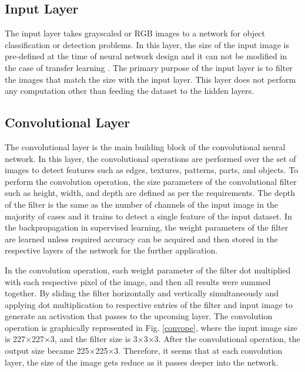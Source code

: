 \subsection{Input Layer}
The input layer takes grayscaled or RGB images to a network for object classification or detection problems. In this layer, the size of the input image is pre-defined at the time of neural network design and it can not be modified in the case of transfer learning \cite{coursera1}. The primary purpose of the input layer is to filter the images that match the size with the input layer. This layer does not perform any computation other than feeding the dataset to the hidden layers.

\subsection{Convolutional Layer}
The convolutional layer is the main building block of the convolutional neural network. In this layer, the convolutional operations are performed over the set of images to detect features such as edges, textures, patterns, parts, and objects. To perform the convolution operation, the size parameters of the convolutional filter such as height, width, and depth are defined as per the requirements. The depth of the filter is the same as the number of channels of the input image in the majority of cases and it trains to detect a single feature of the input dataset. In the backpropagation in supervised learning, the weight parameters of the filter are learned unless required accuracy can be acquired and then stored in the respective layers of the network for the further application. 

In the convolution operation, each weight parameter of the filter dot multiplied with each respective pixel of the image, and then all results were summed together. By sliding the filter horizontally and vertically simultaneously and applying dot multiplication to respective entries of the filter and input image to generate an activation that passes to the upcoming layer. The convolution operation is graphically represented in Fig. \ref{convope}, where the input image size is 227×227×3, and the filter size is 3×3×3. After the convolutional operation, the output size became 225×225×3. Therefore, it seems that at each convolution layer, the size of the image gets reduce as it passes deeper into the network.  
     
